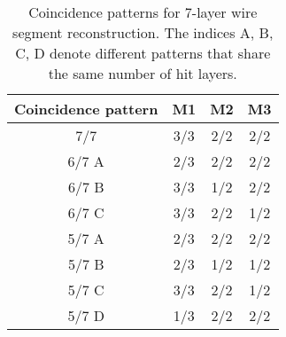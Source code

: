 \begin{table}[htbp]
\centering
\small
\caption{Coincidence patterns for 7-layer wire segment reconstruction. The indices A, B, C, D denote different patterns that share the same number of hit layers.}
\label{tab:wire_coin}
\begin{tabular}{c|ccc}
\hline
\textbf{Coincidence pattern} & \textbf{M1} & \textbf{M2} & \textbf{M3} \\
\hline
7/7       & 3/3 & 2/2 & 2/2 \\
6/7 A     & 2/3 & 2/2 & 2/2 \\
6/7 B     & 3/3 & 1/2 & 2/2 \\
6/7 C     & 3/3 & 2/2 & 1/2 \\
5/7 A     & 2/3 & 2/2 & 2/2 \\
5/7 B     & 2/3 & 1/2 & 1/2 \\
5/7 C     & 3/3 & 2/2 & 1/2 \\
5/7 D     & 1/3 & 2/2 & 2/2 \\
\hline
\end{tabular}
\end{table}